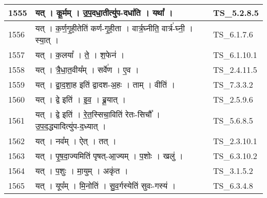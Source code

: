 \documentclass[17pt]{extarticle}
\begin{document}
\begin{longtable}{||p{0.4in}||p{4.9in}||p{0.9in}||}
    \hline
        
    1555 & यत्   ।   कू॒र्मम्   ।   उ॒प॒दधा॒तीत्यु॑प{-}दधा॑ति   ।   यथा᳚   ।    & TS\_5.2.8.5       \\
    
    \hline
        
    1556 & यत्   ।   क॒र्ण॒गृ॒ही॒तेति॑ कर्ण{-}गृ॒ही॒ता   ।   वार्त्र॒घ्नीति॒ वार्त्र॑{-}घ्नी॒   ।   स्या॒त्   ।    & TS\_6.1.7.6       \\
    
    \hline
        
    1557 & यत्   ।   क॒लया᳚   ।   ते॒   ।   श॒फेन॑   ।    & TS\_6.1.10.1       \\
    
    \hline
        
    1558 & यत्   ।   त्रै॒धा॒त॒वीय᳚म्   ।   सर्वे॑ण   ।   ए॒व   ।    & TS\_2.4.11.5       \\
    
    \hline
        
    1559 & यत्   ।   द्वा॒द॒शा॒ह इति॑ द्वादश{-}अ॒हः   ।   ताम्   ।   वीति॑   ।    & TS\_7.3.3.2       \\
    
    \hline
        
    1560 & यत्   ।   द्वे इति॑   ।   इ॒व॒   ।   ब्रू॒यात्   ।    & TS\_2.5.9.6       \\
    
    \hline
        
    1561 & यत्   ।   द्वे इति॑   ।   रे॒त॒स्सिचा॒विति॑ रेतः{-}सिचौ᳚   ।   उ॒प॒द॒द्ध्यादित्यु॑प{-}द॒ध्यात्   ।    & TS\_5.6.8.5       \\
    
    \hline
        
    1562 & यत्   ।   नव᳚म्   ।   ऐत्   ।   तत्   ।    & TS\_2.3.10.1       \\
    
    \hline
        
    1563 & यत्   ।   पृ॒ष॒दा॒ज्यमिति॑ पृषत्{-}आ॒ज्यम्   ।   प॒शोः   ।   खलु॑   ।    & TS\_6.3.10.2       \\
    
    \hline
        
    1564 & यत्   ।   प॒शुः   ।   मा॒युम्   ।   अकृ॑त   ।    & TS\_3.1.5.2       \\
    
    \hline
        
    1565 & यत्   ।   यूप᳚म्   ।   मि॒नोति॑   ।   सु॒व॒र्गस्येति॑ सुवः{-}गस्य॑   ।    & TS\_6.3.4.8       \\
    

\end{longtable}
\end{document}
